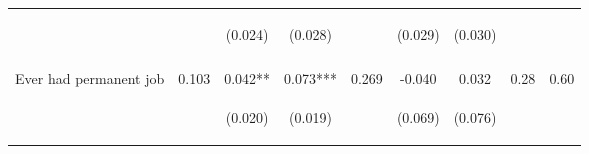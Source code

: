 \begin{table}[h!]
{\begin{tabular}{lcccccccc}
 & \begin{footnotesize}\end{footnotesize} & \begin{footnotesize}(0.024)\end{footnotesize} & \begin{footnotesize}(0.028)\end{footnotesize} & \begin{footnotesize}\end{footnotesize} & \begin{footnotesize}(0.029)\end{footnotesize} & \begin{footnotesize}(0.030)\end{footnotesize} & \begin{footnotesize}\end{footnotesize} & \begin{footnotesize}\end{footnotesize}\\
 & \begin{footnotesize}\end{footnotesize} & \begin{footnotesize}[0.076]\end{footnotesize} & \begin{footnotesize}[0.003]\end{footnotesize} & \begin{footnotesize}\end{footnotesize} & \begin{footnotesize}[1.000]\end{footnotesize} & \begin{footnotesize}[0.087]\end{footnotesize} & \begin{footnotesize}\end{footnotesize} & \begin{footnotesize}\end{footnotesize}\\
\noalign{\smallskip}Ever had permanent job & 0.103 & 0.042** & 0.073*** & 0.269 & -0.040 & 0.032 & 0.28 & 0.60\\
 & \begin{footnotesize}\end{footnotesize} & \begin{footnotesize}(0.020)\end{footnotesize} & \begin{footnotesize}(0.019)\end{footnotesize} & \begin{footnotesize}\end{footnotesize} & \begin{footnotesize}(0.069)\end{footnotesize} & \begin{footnotesize}(0.076)\end{footnotesize} & \begin{footnotesize}\end{footnotesize} & \begin{footnotesize}\end{footnotesize}\\

\end{tabular}}
\end{table}
